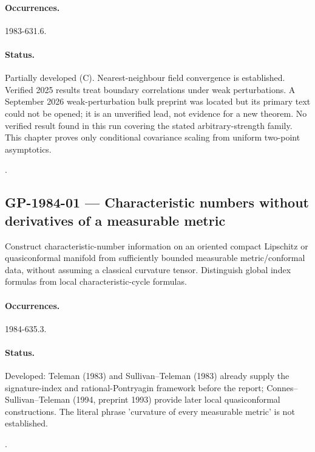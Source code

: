 \paragraph{Occurrences.} 1983-631.6.

\paragraph{Status.} Partially developed (C). Nearest-neighbour field convergence is established. Verified 2025 results treat boundary correlations under weak perturbations. A September 2026 weak-perturbation bulk preprint was located but its primary text could not be opened; it is an unverified lead, not evidence for a new theorem. No verified result found in this run covering the stated arbitrary-strength family. This chapter proves only conditional covariance scaling from uniform two-point asymptotics.

\noindent\citep{camia2015magnetization,cavagiulianigreenblatt2025boundary,openai2026isingunverified}.

\subsection{GP-1984-01 --- Characteristic numbers without derivatives of a measurable metric}

\label{problem:GP-1984-01}

Construct characteristic-number information on an oriented compact Lipschitz or quasiconformal manifold from sufficiently bounded measurable metric/conformal data, without assuming a classical curvature tensor. Distinguish global index formulas from local characteristic-cycle formulas.

\paragraph{Occurrences.} 1984-635.3.

\paragraph{Status.} Developed: Teleman (1983) and Sullivan--Teleman (1983) already supply the signature-index and rational-Pontryagin framework before the report; Connes--Sullivan--Teleman (1994, preprint 1993) provide later local quasiconformal constructions. The literal phrase 'curvature of every measurable metric' is not established.

\noindent\citep{teleman1983signature,sullivanteleman1983novikov,connessullivanteleman1994quasiconformal}.

